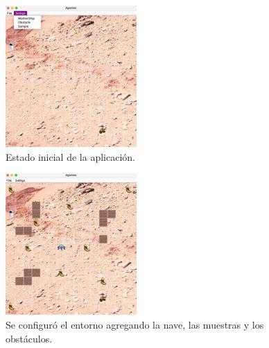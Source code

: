 	\begin{multicols}{2}
		\begin{figure}[H]
			\centering
			\includegraphics[width = 5cm]{images/initialState.jpg}
			\caption{Estado inicial de la aplicación.}
			\label{figInitialState}
		\end{figure}
		
	
		\begin{figure}[H]
			\centering
			\includegraphics[width = 5cm]{images/setUp.jpg}
			\caption{Se configuró el entorno agregando la nave, las muestras y los obstáculos.}
			\label{figSetUp}
		\end{figure}
		

\end{multicols}
